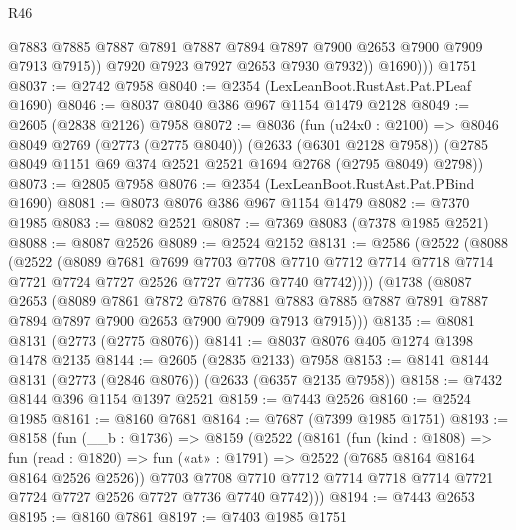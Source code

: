\begin{lexlean}{R46}
\begin{coremodule}
                @7883
                @7885
                @7887
                @7891
                @7887
                @7894
                @7897
                @7900
                @2653
                @7900
                @7909
                @7913
                @7915))
            @7920
            @7923
            @7927
            @2653
            @7930
            @7932))
          @1690)))
    @1751
@8037 := @2742 @7958
@8040 := @2354 (LexLeanBoot.RustAst.Pat.PLeaf @1690)
@8046 := @8037 @8040 @386 @967 @1154 @1479 @2128
@8049 := @2605 (@2838 @2126) @7958
@8072 := @8036
    (fun (u24x0 : @2100) =>
    @8046
      @8049
      @2769
      (@2773 (@2775 @8040))
      (@2633 (@6301 @2128 @7958))
      (@2785 @8049 @1151 @69 @374 @2521 @2521 @1694 @2768 (@2795 @8049) @2798))
@8073 := @2805 @7958
@8076 := @2354 (LexLeanBoot.RustAst.Pat.PBind @1690)
@8081 := @8073 @8076 @386 @967 @1154 @1479
@8082 := @7370 @1985
@8083 := @8082 @2521
@8087 := @7369 @8083 (@7378 @1985 @2521)
@8088 := @8087 @2526
@8089 := @2524 @2152
@8131 := @2586
    (@2522
      (@8088
        (@2522
          (@8089
            @7681
            @7699
            @7703
            @7708
            @7710
            @7712
            @7714
            @7718
            @7714
            @7721
            @7724
            @7727
            @2526
            @7727
            @7736
            @7740
            @7742))))
    (@1738
      (@8087
        @2653
        (@8089
          @7861
          @7872
          @7876
          @7881
          @7883
          @7885
          @7887
          @7891
          @7887
          @7894
          @7897
          @7900
          @2653
          @7900
          @7909
          @7913
          @7915)))
@8135 := @8081 @8131 (@2773 (@2775 @8076))
@8141 := @8037 @8076 @405 @1274 @1398 @1478 @2135
@8144 := @2605 (@2835 @2133) @7958
@8153 := @8141 @8144 @8131 (@2773 (@2846 @8076)) (@2633 (@6357 @2135 @7958))
@8158 := @7432 @8144 @396 @1154 @1397 @2521
@8159 := @7443 @2526
@8160 := @2524 @1985
@8161 := @8160 @7681
@8164 := @7687 (@7399 @1985 @1751)
@8193 := @8158
    (fun (__b : @1736) =>
    @8159
      (@2522
        (@8161
          (fun (kind : @1808) =>
          fun (read : @1820) => fun («at» : @1791) => @2522 (@7685 @8164 @8164 @8164 @2526 @2526))
          @7703
          @7708
          @7710
          @7712
          @7714
          @7718
          @7714
          @7721
          @7724
          @7727
          @2526
          @7727
          @7736
          @7740
          @7742)))
@8194 := @7443 @2653
@8195 := @8160 @7861
@8197 := @7403 @1985 @1751

\end{coremodule}
\end{lexlean}
